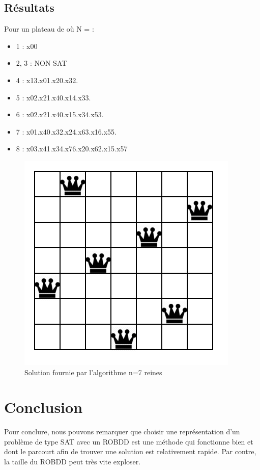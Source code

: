 \documentclass{article}
\begin{document}
\subsection{Résultats}
Pour un plateau de où N = :
\begin{itemize}
  \item 1 : x00
  \item 2, 3 : NON SAT
  \item 4 : x13.x01.x20.x32.
  \item 5 : x02.x21.x40.x14.x33.
  \item 6 : x02.x21.x40.x15.x34.x53.
  \item 7 : x01.x40.x32.x24.x63.x16.x55.
  \item 8 : x03.x41.x34.x76.x20.x62.x15.x57
\end{itemize}
\begin{figure}
	\begin{center}
		\includegraphics[scale=0.7]{sevenkingdom}\\
		Solution fournie par l'algorithme n=7 reines
	\end{center}
\end{figure}
\section{Conclusion}
Pour conclure, nous pouvons remarquer que choisir une représentation d'un problème de type SAT avec un ROBDD est une méthode qui fonctionne bien et dont le parcourt afin de trouver une solution est relativement rapide. Par contre, la taille du ROBDD peut très vite exploser.
\end{document}

